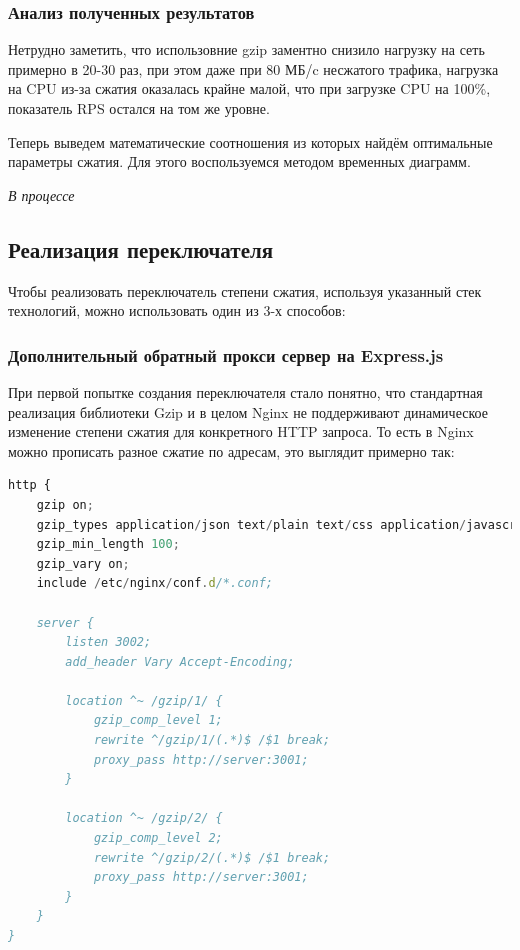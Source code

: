 \documentclass[12pt]{article}
\begin{document}
\subsubsection{Анализ полученных результатов}

Нетрудно заметить, что использовние gzip заментно снизило нагрузку на сеть примерно в 20-30 раз,
при этом даже при 80 МБ/c несжатого трафика, нагрузка на CPU из-за сжатия оказалась крайне малой, что при загрузке CPU на 100\%,
показатель RPS остался на том же уровне.

Теперь выведем математические соотношения из которых найдём оптимальные параметры сжатия. Для этого воспользуемся методом временных диаграмм.

\textit{В процессе}

\subsection{Реализация переключателя}

Чтобы реализовать переключатель степени сжатия, используя указанный стек технологий, можно использовать один из 3-х способов:

\subsubsection{Дополнительный обратный прокси сервер на Express.js}

При первой попытке создания переключателя стало понятно, что стандартная реализация библиотеки Gzip и в целом Nginx не поддерживают динамическое изменение степени сжатия для конкретного HTTP запроса. То есть в Nginx можно прописать разное сжатие по адресам, это выглядит примерно так:

\begin{lstlisting}[language=JavaScript]
http {
    gzip on;
    gzip_types application/json text/plain text/css application/javascript application/xml;
    gzip_min_length 100;
    gzip_vary on;
    include /etc/nginx/conf.d/*.conf;

    server {
        listen 3002;
        add_header Vary Accept-Encoding;

        location ^~ /gzip/1/ {
            gzip_comp_level 1;
            rewrite ^/gzip/1/(.*)$ /$1 break;
            proxy_pass http://server:3001;
        }

        location ^~ /gzip/2/ {
            gzip_comp_level 2;
            rewrite ^/gzip/2/(.*)$ /$1 break;
            proxy_pass http://server:3001;
        }
    }
}
\end{lstlisting}
\end{document}
